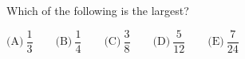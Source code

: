 Which of the following is the largest?

$\text{(A)}\ \dfrac{1}{3} \qquad \text{(B)}\ \dfrac{1}{4} \qquad \text{(C)}\ \dfrac{3}{8} \qquad \text{(D)}\ \dfrac{5}{12} \qquad \text{(E)}\ \dfrac{7}{24}$
